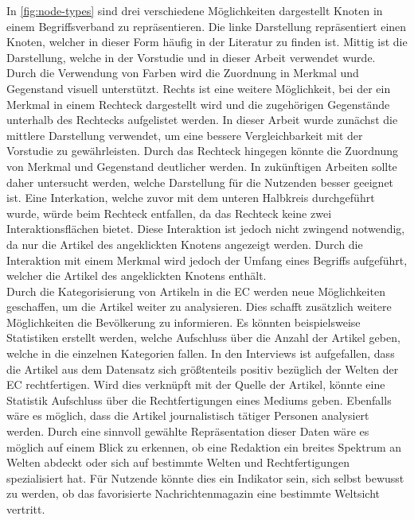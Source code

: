 In \autoref{fig:node-types} sind drei verschiedene Möglichkeiten dargestellt Knoten in einem Begriffsverband zu repräsentieren.
Die linke Darstellung repräsentiert einen Knoten, welcher in dieser Form häufig in der Literatur zu finden ist.
Mittig ist die Darstellung, welche in der Vorstudie und in dieser Arbeit verwendet wurde.
Durch die Verwendung von Farben wird die Zuordnung in Merkmal und Gegenstand visuell unterstützt.
Rechts ist eine weitere Möglichkeit, bei der ein Merkmal in einem Rechteck dargestellt wird und die zugehörigen Gegenstände unterhalb des Rechtecks aufgelistet werden.
In dieser Arbeit wurde zunächst die mittlere Darstellung verwendet, um eine bessere Vergleichbarkeit mit der Vorstudie zu gewährleisten.
Durch das Rechteck hingegen könnte die Zuordnung von Merkmal und Gegenstand deutlicher werden.
In zukünftigen Arbeiten sollte daher untersucht werden, welche Darstellung für die Nutzenden besser geeignet ist.
Eine Interkation, welche zuvor mit dem unteren Halbkreis durchgeführt wurde, würde beim Rechteck entfallen, da das Rechteck keine zwei Interaktionsflächen bietet.
Diese Interaktion ist jedoch nicht zwingend notwendig, da nur die Artikel des angeklickten Knotens angezeigt werden.
Durch die Interaktion mit einem Merkmal wird jedoch der Umfang eines Begriffs aufgeführt, welcher die Artikel des angeklickten Knotens enthält.\\

Durch die Kategorisierung von Artikeln in die \ac{EC} werden neue Möglichkeiten geschaffen, um die Artikel weiter zu analysieren.
Dies schafft zusätzlich weitere Möglichkeiten die Bevölkerung zu informieren.
Es könnten beispielsweise Statistiken erstellt werden, welche Aufschluss über die Anzahl der Artikel geben, welche in die einzelnen Kategorien fallen.
In den Interviews ist aufgefallen, dass die Artikel aus dem Datensatz sich größtenteils positiv bezüglich der Welten der \ac{EC} rechtfertigen.
Wird dies verknüpft mit der Quelle der Artikel, könnte eine Statistik Aufschluss über die Rechtfertigungen eines Mediums geben.
Ebenfalls wäre es möglich, dass die Artikel journalistisch tätiger Personen analysiert werden.
Durch eine sinnvoll gewählte Repräsentation dieser Daten wäre es möglich auf einem Blick zu erkennen, ob eine Redaktion ein breites Spektrum an Welten abdeckt oder sich auf bestimmte Welten und Rechtfertigungen spezialisiert hat.
Für Nutzende könnte dies ein Indikator sein, sich selbst bewusst zu werden, ob das favorisierte Nachrichtenmagazin eine bestimmte Weltsicht vertritt. \\

